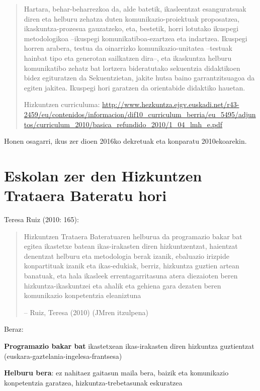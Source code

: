 \documentclass[
]{book}
\begin{document}
\begin{quote}
Hartara, behar-beharrezkoa da, alde batetik, ikasleentzat esanguratsuak diren eta helburu zehatza duten komunikazio-proiektuak proposatzea, ikaskuntza-prozesua gauzatzeko, eta, bestetik, horri lotutako ikuspegi metodologikoa --ikuspegi komunikatiboa-ezartzea eta indartzea. Ikuspegi horren arabera, testua da oinarrizko komunikazio-unitatea --testuak hainbat tipo eta generotan sailkatzen dira--, eta ikaskuntza helburu komunikatibo zehatz bat lortzera bideratutako sekuentzia didaktikoen bidez egituratzen da Sekuentzietan, jakite hutsa baino garrantzitsuagoa da egiten jakitea. Ikuspegi hori garatzen da orientabide didaktiko hauetan.

Hizkuntzen curriculuma: \url{http://www.hezkuntza.ejgv.euskadi.net/r43-2459/eu/contenidos/informacion/dif10_curriculum_berria/eu_5495/adjuntos/curriculum_2010/basica_refundido_2010/1_04_lmh_e.pdf}
\end{quote}

Honen osagarri, ikus zer dioen 2016ko dekretuak eta konparatu 2010ekoarekin.

\hypertarget{eskolan-zer-den-hizkuntzen-trataera-bateratu-hori}{%
\section{Eskolan zer den Hizkuntzen Trataera Bateratu hori}\label{eskolan-zer-den-hizkuntzen-trataera-bateratu-hori}}

Teresa Ruiz (2010: 165):

\begin{quote}
Hizkuntzen Trataera Bateratuaren helburua da programazio bakar bat egitea ikastetxe batean ikas-irakasten diren hizkuntzentzat, haientzat denentzat helburu eta metodologia berak izanik, ebaluazio irizpide konpartituak izanik eta ikas-edukiak, berriz, hizkuntza guztien artean banatuak, eta hala ikasleek errentagarritasuna atera diezaioten beren hizkuntza-ikaskuntzei eta ahalik eta gehiena gara dezaten beren komunikazio konpetentzia eleaniztuna

-- Ruiz, Teresa (2010) (JMren itzulpena)
\end{quote}

Beraz:

\textbf{Programazio bakar bat} ikastetxean ikas-irakasten diren hizkuntza guztientzat (euskara-gaztelania-ingelesa-frantsesa)

\textbf{Helburu bera}: ez nahitaez gaitasun maila bera, baizik eta komunikazio konpetentzia garatzea, hizkuntza-trebetasunak eskuratzea
\end{document}
